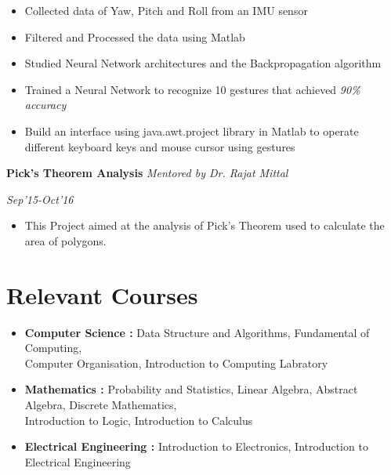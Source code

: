 \documentclass[14pt]{article} %
\begin{document}
\begin{itemize}
\begin{itemize}
\vspace{-4pt}
\item Collected data of Yaw, Pitch and Roll from an IMU sensor
\vspace{-4pt}
\item Filtered and Processed the data using Matlab
\vspace{-4pt}
\item Studied Neural Network architectures and the Backpropagation algorithm 
\vspace{-4pt}
\item Trained a Neural Network to recognize 10 gestures that achieved \textit{90\% accuracy}
\vspace{-4pt}
\item Build an interface using java.awt.project library in Matlab to operate different keyboard keys and mouse cursor using gestures 
\vspace{-4pt}
\end{itemize}
\begin{minipage}{0.78 \textwidth}
\item{\textbf{Pick's Theorem Analysis} \textit{Mentored by Dr. Rajat Mittal}}
\end{minipage}
\begin{minipage}{0.14 \textwidth}
\textit{Sep'15-Oct'16}
\end{minipage}
\begin{itemize}
\item This Project aimed at the analysis of Pick's Theorem used to calculate the area of polygons. 
\end{itemize}
\vspace{-7pt}
\section*{Relevant Courses }
\begin{minipage}{ \textwidth}
\begin{itemize}
\item{\bfseries {{Computer Science}} :}\hspace{6mm}    Data Structure and Algorithms, Fundamental of Computing,\\
\hspace*{42mm}Computer Organisation,
 Introduction to Computing Labratory
 \vspace{-8pt}
\item {\bfseries { {Mathematics}} :}\hspace{15mm} Probability and Statistics, Linear Algebra, Abstract Algebra, Discrete Mathematics, \\
\vspace{-4pt}
\hspace*{40mm} Introduction to Logic, Introduction to Calculus
\vspace{-4pt}
\item{\bfseries {{Electrical Engineering}} :} Introduction to Electronics, Introduction to Electrical Engineering 
\end{itemize}
\end{minipage}

\end{itemize}
\end{document}

